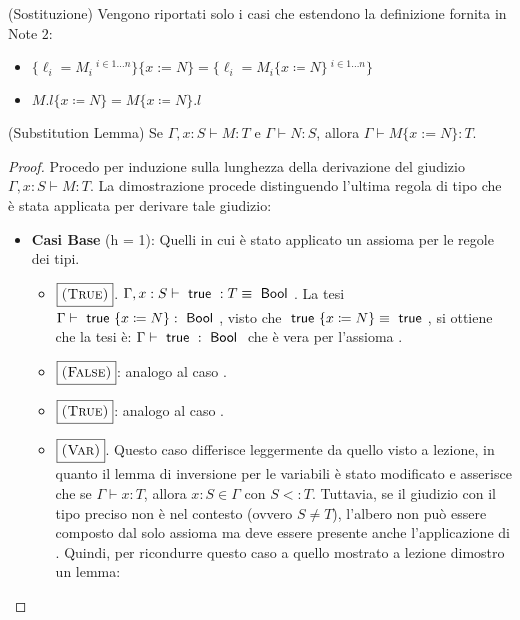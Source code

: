 (Sostituzione)
	Vengono riportati solo i casi che estendono la definizione fornita in Note $2$:
	\begin{itemize}
		\item $\{\ell_i = M_i\ ^{i \in 1 \dots n} \} \{x := N\} = \{\ell_i = M_i \{x \coloneqq N\}\ ^{i \in 1 \dots n} \}$
		\item $M.l\{x \coloneqq N \} = M\{x \coloneqq N \}.l$
	\end{itemize}



(Substitution Lemma)
Se $\Gamma, x : S \vdash M : T$ e $\Gamma \vdash N : S$, allora $\Gamma \vdash M\{x := N\}:T.$	

\begin{proof}
Procedo per induzione sulla lunghezza della derivazione del giudizio
$\Gamma, x : S \vdash M : T$. La dimostrazione procede distinguendo l'ultima
regola di tipo che \`e stata applicata per derivare tale giudizio:
\begin{itemize}
	\item \textbf{Casi Base} (h = 1): Quelli in cui \`e stato applicato un assioma per le regole dei tipi.
	\begin{itemize}
		\item $\boxed{\textsc{(True)}}$. 
		$\Gamma, x : S \vdash \true : T \equiv \Bool$. La tesi $\Gamma \vdash \true\{x \coloneqq N\} : \Bool$, visto
		che $\true \{x \coloneqq N \} \equiv \true$, si ottiene che la tesi \`e:
		$\Gamma \vdash \true: \Bool$ che \`e vera per l'assioma .
		\item $\boxed{\textsc{(False)}}$: analogo al caso .
		\item $\boxed{}$: analogo al caso \myrule{True}.
		\item $\boxed{\textsc{(Var)}}$. Questo caso differisce leggermente da quello visto a lezione, in quanto il lemma di inversione
		per le variabili \`e stato modificato e asserisce che se $\Gamma \vdash x : T$, allora $x: S \in \Gamma$ con $S <: T$. 
		Tuttavia, se il giudizio con il tipo preciso non \`e nel contesto (ovvero $S \neq T$), l'albero non pu\`o essere composto dal solo assioma  ma
		deve essere presente anche l'applicazione di .
		Quindi, per ricondurre questo caso a quello mostrato a lezione dimostro un lemma:
		\vspace{10pt}
		

\end{itemize}
\end{itemize}
\end{proof}
